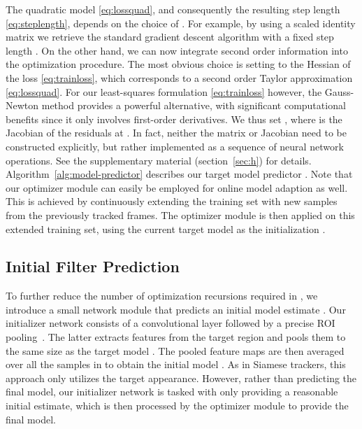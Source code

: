 \documentclass[10pt,twocolumn,letterpaper]{article}
\begin{document}
The quadratic model \eqref{eq:lossquad}, and consequently the resulting step length \eqref{eq:steplength}, depends on the choice of . For example, by using a scaled identity matrix  we retrieve the standard gradient descent algorithm with a fixed step length . On the other hand, we can now integrate second order information into the optimization procedure. The most obvious choice is setting  to the Hessian of the loss \eqref{eq:trainloss}, which corresponds to a second order Taylor approximation \eqref{eq:lossquad}. For our least-squares formulation \eqref{eq:trainloss} however, the Gauss-Newton method \cite{NumericalOptimization} provides a powerful alternative, with significant computational benefits since it only involves first-order derivatives. We thus set , where  is the Jacobian of the residuals at . In fact, neither the matrix  or Jacobian  need to be constructed explicitly, but rather implemented as a sequence of neural network operations. See the supplementary material (section~\ref{sec:h}) for details. Algorithm~\ref{alg:model-predictor} describes our target model predictor . Note that our optimizer module can easily be employed for online model adaption as well. This is achieved by continuously extending the training set  with new samples from the previously tracked frames. The optimizer module is then applied on this extended training set, using the current target model as the initialization .


\subsection{Initial Filter Prediction}
\label{sec:initializer}
To further reduce the number of optimization recursions required in , we introduce a small network module that predicts an initial model estimate . Our initializer network consists of a convolutional layer followed by a precise ROI pooling~\cite{IOUNet}. The latter extracts features from the target region and pools them to the same size as the target model . The pooled feature maps are then averaged over all the samples in  to obtain the initial model . As in Siamese trackers, this approach only utilizes the target appearance. However, rather than predicting the final model, our initializer network is tasked with only providing a reasonable initial estimate, which is then processed by the optimizer module to provide the final model.
\end{document}
